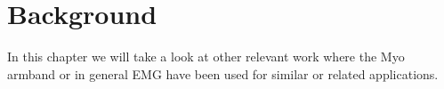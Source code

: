 \chapter{Background}
In this chapter we will take a look at other relevant work where the Myo armband or in general EMG have been used for similar or related applications.




